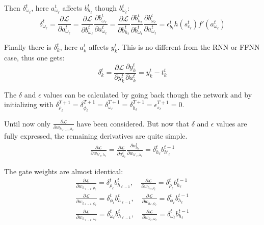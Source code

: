 Then $\delta_{\omega_\ell}^t$, here $a_{\omega_\ell}^t$ affects $b_{h_\ell}^t$ though $b_{\omega_\ell}^t$:
\begin{equation}
\delta_{\omega_\ell}^t
= \frac{\partial \mathcal{L}}{\partial a_{\omega_\ell}^t}
= \frac{\partial \mathcal{L}}{\partial b_{\omega_\ell}^t} \frac{\partial b_{\omega_\ell}^t}{\partial a_{\omega_\ell}^t}
= \frac{\partial \mathcal{L}}{\partial b_{h_\ell}^t} \frac{\partial b_{h_\ell}^t}{\partial b_{\omega_\ell}^t} \frac{\partial b_{\omega_\ell}^t}{\partial a_{\omega_\ell}^t}
= \epsilon_{b_\ell}^t h(s_{c_\ell}^t) f'(a_{\omega_\ell}^t)
\end{equation}

Finally there is $\delta_k^t$, here $a_k^t$ affects $y_k^t$. This is no different from the RNN or FFNN case, thus one gets:
\begin{equation}
\delta_k^t = \frac{\partial \mathcal{L}}{\partial y_k^t} \frac{\partial y_k^t}{\partial a_k^t} = y_k^t - t_k^t
\end{equation}

The $\delta$ and $\epsilon$ values can be calculated by going back though the network and by initializing with $\delta_{\rho_\ell}^{T+1} = \delta_{\phi_\ell}^{T+1} = \delta_{\omega_\ell}^{T+1} = \delta_{h_\ell}^{T+1} = \epsilon_{s_\ell}^{T+1} = 0$. 

Until now only $\frac{\partial \mathcal{L}}{\partial w_{h_{\ell-1}, h_\ell}}$ have been considered. But now that $\delta$ and $\epsilon$ values are fully expressed, the remaining derivatives are quite simple.
\begin{align}
\frac{\partial \mathcal{L}}{\partial w_{h'_\ell, h_\ell}}
= \frac{\partial \mathcal{L}}{\partial a_{h_\ell}^t} \frac{\partial a_{h_\ell}^t}{\partial w_{h'_\ell, h_\ell}}
= \delta_{h_\ell}^t b_{h'_\ell}^{t-1}
\end{align}

The gate weights are almost identical:
\begin{align}
\frac{\partial \mathcal{L}}{\partial w_{h_{\ell-1}, \rho_\ell}}
= \delta_{\rho_\ell}^t b_{h_{\ell-1}}^t, \quad
\frac{\partial \mathcal{L}}{\partial w_{h_\ell, \rho_\ell}}
= \delta_{\rho_\ell}^t b_{h_\ell}^{t-1} \\
\frac{\partial \mathcal{L}}{\partial w_{h_{\ell-1}, \phi_\ell}}
= \delta_{\phi_\ell}^t b_{h_{\ell-1}}^t, \quad
\frac{\partial \mathcal{L}}{\partial w_{h_\ell, \phi_\ell}}
= \delta_{\phi_\ell}^t b_{h_\ell}^{t-1} \\
\frac{\partial \mathcal{L}}{\partial w_{h_{\ell-1}, \omega_\ell}}
= \delta_{\omega_\ell}^t b_{h_{\ell-1}}^t, \quad
\frac{\partial \mathcal{L}}{\partial w_{h_\ell, \omega_\ell}}
= \delta_{\omega_\ell}^t b_{h_\ell}^{t-1}
\end{align}
